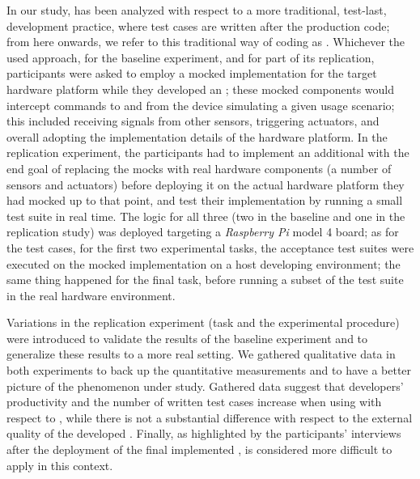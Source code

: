 In our study, \tdd has been analyzed with respect to a more traditional, test-last, development practice, where test cases are written after the production code; from here onwards, we refer to this traditional way of coding as \notdd. 
Whichever the used approach, for the baseline experiment, and for part of its replication, participants were asked to employ a mocked implementation for the target hardware platform while they developed an \es; these mocked components would intercept commands to and from the device simulating a given usage scenario; this included receiving signals from other sensors, triggering actuators, and overall adopting the implementation details of the hardware platform.
In the replication experiment, the participants had to implement an additional \es with the end goal of replacing the mocks with real hardware components (a number of sensors and actuators) before deploying it on the actual hardware platform they had mocked up to that point, and test their implementation by running a small test suite in real time. 
The logic for all three \ess (two in the baseline and one in the replication study) was deployed targeting a \textit{Raspberry Pi} model 4 board; as for the test cases, for the first two experimental tasks, the acceptance test suites were executed on the mocked implementation on a host developing environment; the same thing happened for the final task, before running a subset of the test suite in the real hardware environment. 

Variations in the replication experiment (task and the experimental procedure) were introduced to validate the results of the baseline experiment and to generalize these results to a more real setting. 
We gathered qualitative data in both experiments to back up the quantitative measurements and to have a better picture of the phenomenon under study. Gathered data suggest that developers' productivity and the number of written test cases increase when using \tdd with respect to \notdd, while there is not a substantial difference with respect to the external quality of the developed \ess.
Finally, as highlighted by the participants' interviews after the deployment of the final implemented \es, \tdd is considered more difficult to apply in this context.

